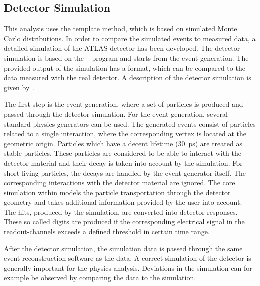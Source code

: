 \subsection{Detector Simulation}
This analysis uses the template method, which is based on simulated Monte Carlo distributions. In order to compare the simulated events to measured data, a detailed simulation of the ATLAS detector has been developed. 
The detector simulation is based on the ~\cite{Agostinelli:2002hh} program  and starts from the event generation. The provided output of the simulation has a format, which can be compared to the data measured with the real detector.  
 A description of the detector simulation is given by~\cite{Aad:2010ah}. 
 
 The first step is the event generation, where a set of particles is produced and passed through the detector simulation. 
For the event generation, several standard physics generators can be used. 
 The generated events consist of particles  related to a single interaction, where the corresponding vertex is located at the geometric origin. 
 Particles which have a decent lifetime (30~ps) are treated as stable particles. These particles are considered to be able to interact with the detector material and their decay is taken into account by the simulation. For short living particles, the decays are handled by the event generator itself. The corresponding interactions with the detector material are ignored.  
The core simulation within   models the particle transportation through the detector geometry and takes additional information provided by the user into account. The hits,  produced by the simulation, are converted into detector responses. These so called digits are produced  if the corresponding electrical signal in the readout-channels exceeds a defined threshold in certain time range. ~\cite{Aad:2010ah} 

After the detector simulation, the simulation data is passed through the same event reconstruction software as the data.
A correct simulation of the detector is generally  important for the physics analysis. Deviations in the simulation can  for example be observed by comparing the data to the simulation.
